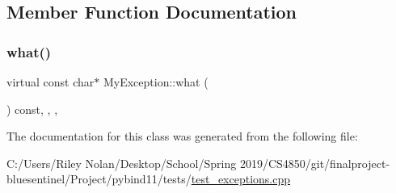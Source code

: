 \subsection{Member Function Documentation}
\mbox{\label{class_my_exception_ab8ff1f5d50dd5f229b9f74d9ea655236}} 
\subsubsection{\texorpdfstring{what()}{what()}}
{\footnotesize\ttfamily virtual const char$\ast$ My\+Exception\+::what (\begin{DoxyParamCaption}{ }\end{DoxyParamCaption}) const\hspace{0.3cm}{\ttfamily [inline]}, {\ttfamily [override]}, {\ttfamily [virtual]}, {\ttfamily [noexcept]}}



The documentation for this class was generated from the following file\+:\begin{DoxyCompactItemize}
\item 
C\+:/\+Users/\+Riley Nolan/\+Desktop/\+School/\+Spring 2019/\+C\+S4850/git/finalproject-\/bluesentinel/\+Project/pybind11/tests/\mbox{\hyperlink{test__exceptions_8cpp}{test\+\_\+exceptions.\+cpp}}\end{DoxyCompactItemize}
